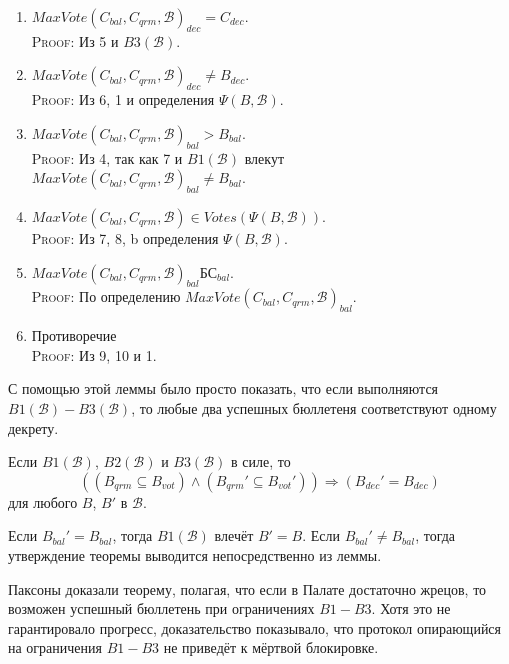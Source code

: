 \documentclass[12pt, a4paper]{article} %
\begin{document}
\begin{lemmaproof}
\begin{enumerate}
    \item $MaxVote(C_{bal}, C_{qrm}, \mathcal{B})_{dec} = C_{dec}$.\\
          \textsc{Proof}: Из 5 и $B3(\mathcal{B})$.

    \item $MaxVote(C_{bal}, C_{qrm}, \mathcal{B})_{dec} \neq B_{dec}$.\\
          \textsc{Proof}: Из 6, 1 и определения $\Psi(B, \mathcal{B})$.

    \item $MaxVote(C_{bal}, C_{qrm}, \mathcal{B})_{bal} > B_{bal}$.\\
          \textsc{Proof}: Из 4, так как 7 и $B1(\mathcal{B})$ влекут \\
          $MaxVote(C_{bal}, C_{qrm}, \mathcal{B})_{bal} \neq B_{bal}$.

    \item $MaxVote(C_{bal}, C_{qrm}, \mathcal{B}) \in Votes(\Psi(B, \mathcal{B}))$.\\
          \textsc{Proof}: Из 7, 8, b определения $\Psi(B, \mathcal{B})$.

    \item $MaxVote(C_{bal}, C_{qrm}, \mathcal{B})_{bal} Б С_{bal}$.\\
          \textsc{Proof}: По определению $MaxVote(C_{bal}, C_{qrm}, \mathcal{B})_{bal}$.
    
    \item Противоречие\\
          \textsc{Proof}: Из 9, 10 и 1.
\end{enumerate}
\end{lemmaproof}

С помощью этой леммы было просто показать, что если выполняются $B1(\mathcal{B}) - B3(\mathcal{B})$, то любые два успешных бюллетеня соответствуют одному декрету.
\begin{theorem}
Если $B1(\mathcal{B})$, $B2(\mathcal{B})$ и $B3(\mathcal{B})$ в силе, то
\[
    ((B_{qrm} \subseteq B_{vot}) \land (B_{qrm}' \subseteq B_{vot}')) \Rightarrow (B_{dec}' = B_{dec})
\]
для любого $B$, $B'$ в $\mathcal{B}$.
\end{theorem}
\begin{theoremproof}
Если $B_{bal}' = B_{bal}$, тогда $B1(\mathcal{B})$ влечёт $B' = B$. Если $B_{bal}' \neq B_{bal}$, тогда утверждение теоремы выводится непосредственно из леммы.
\end{theoremproof}

Паксоны доказали теорему, полагая, что если в Палате достаточно жрецов, то возможен успешный бюллетень при ограничениях $B1-B3$. Хотя это не гарантировало прогресс, доказательство показывало, что протокол опирающийся на ограничения $B1-B3$ не приведёт к мёртвой блокировке.
\end{document}
